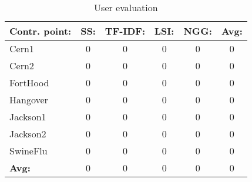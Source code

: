 
\begin{table*}[htbp]
\centering
\begin{tabular}{lccccc}

\textbf{Contr. point:} & \textbf{SS:} & \textbf{TF-IDF:} & \textbf{LSI:} & \textbf{NGG:} & \textbf{Avg:} \\

\hline

Cern1 & 0 & 0 & 0 & 0 & 0 \\
Cern2 & 0 & 0 & 0 & 0 & 0 \\
FortHood & 0 & 0 & 0 & 0 & 0 \\
Hangover & 0 & 0 & 0 & 0 & 0 \\
Jackson1 & 0 & 0 & 0 & 0 & 0 \\
Jackson2 & 0 & 0 & 0 & 0 & 0 \\
SwineFlu & 0 & 0 & 0 & 0 & 0 \\
\hline
\textbf{Avg:} & 0 & 0 & 0 & 0 & 0 \\
\hline

\end{tabular}
\caption{User evaluation}
\label{tab:UserEvaluation}
\end{table*}
